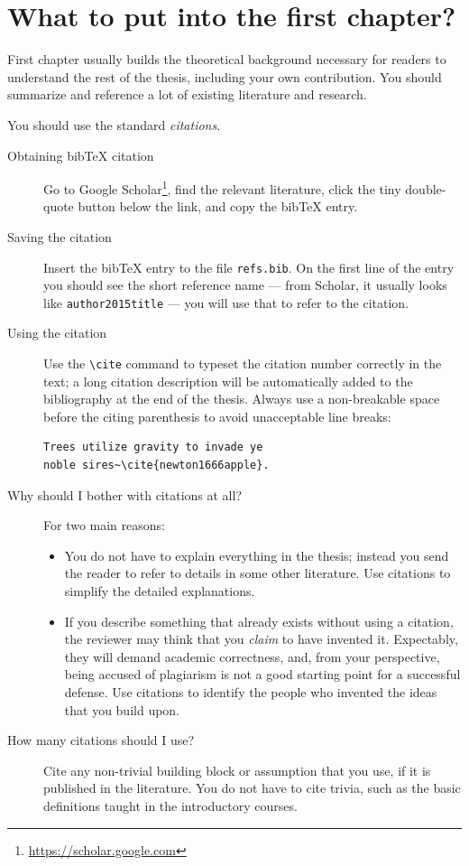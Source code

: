 \section{What to put into the first chapter?}

First chapter usually builds the theoretical background necessary for readers to understand the rest of the thesis, including your own contribution. You should summarize and reference a lot of existing literature and research.

You should use the standard \emph{citations}.

\begin{description}
\item[Obtaining bibTeX citation] Go to Google Scholar\footnote{\url{https://scholar.google.com}}, find the relevant literature, click the tiny double-quote button below the link, and copy the bibTeX entry.
\item[Saving the citation] Insert the bibTeX entry to the file \texttt{refs.bib}. On the first line of the entry you should see the short reference name --- from Scholar, it usually looks like \texttt{author2015title} --- you will use that to refer to the citation.
\item[Using the citation] Use the \verb|\cite| command to typeset the citation number correctly in the text; a long citation description will be automatically added to the bibliography at the end of the thesis. Always use a non-breakable space before the citing parenthesis to avoid unacceptable line breaks:
\begin{Verbatim}
Trees utilize gravity to invade ye
noble sires~\cite{newton1666apple}.
\end{Verbatim}
\item[Why should I bother with citations at all?] For two main reasons:
\begin{itemize}
\item You do not have to explain everything in the thesis; instead you send the reader to refer to details in some other literature. Use citations to simplify the detailed explanations.
\item If you describe something that already exists without using a citation, the reviewer may think that you \emph{claim} to have invented it. Expectably, they will demand academic correctness, and, from your perspective, being accused of plagiarism is not a good starting point for a successful defense. Use citations to identify the people who invented the ideas that you build upon.
\end{itemize}
\item[How many citations should I use?]
Cite any non-trivial building block or assumption that you use, if it is published in the literature. You do not have to cite trivia, such as the basic definitions taught in the introductory courses.


\end{description}
